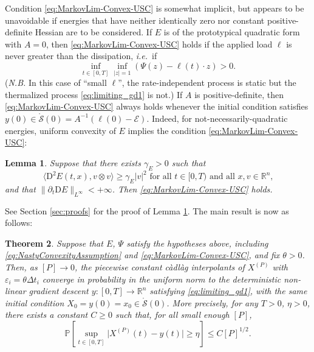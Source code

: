 \documentclass[reqno]{amsart}
\newtheorem{theorem}{Theorem}[section]
\newtheorem{lemma}[theorem]{Lemma}
\theoremstyle{definition}
\begin{document}
Condition \eqref{eq:MarkovLim-Convex-USC} is somewhat implicit, but appears to be unavoidable if energies that have neither identically zero nor constant positive-definite Hessian are to be considered.  If $E$ is of the prototypical quadratic form with $A = 0$, then \eqref{eq:MarkovLim-Convex-USC} holds if the applied load $\ell$ is never greater than the dissipation, \emph{i.e.}\ if
\[
	\inf_{t \in [0, T]} \inf_{| z | = 1} \left( \Psi(z) - \ell(t) \cdot z \right) > 0.
\]
(\emph{N.B.}  In this case of ``small $\ell$'', the rate-independent process is static but the thermalized process \eqref{eq:limiting_gd1} is not.)  If $A$ is positive-definite, then \eqref{eq:MarkovLim-Convex-USC} always holds whenever the initial condition satisfies $y(0) \in \mathring{\mathcal{S}}(0) = A^{-1} ( \ell(0) - {\mathcal{E}} )$.  Indeed, for not-necessarily-quadratic energies, uniform convexity of $E$ implies the condition \eqref{eq:MarkovLim-Convex-USC}:

\begin{lemma}
	\label{lem:unif_cvx_implies_good}
	Suppose that there exists $\gamma_{E} > 0$ such that
	\[
		\langle {\mathrm{D}}^{2} E(t, x) , v \otimes v \rangle \geq \gamma_{E} | v |^{2} \text{ for all $t \in [0, T)$ and all $x, v \in {\mathbb{R}}^{n}$,}
	\]
	and that $\| \partial_{t} {\mathrm{D}} E \|_{L^{\infty}} < + \infty$.  Then \eqref{eq:MarkovLim-Convex-USC} holds.
\end{lemma}

See Section \ref{sec:proofs} for the proof of Lemma \ref{lem:unif_cvx_implies_good}.  The main result is now as follows:

\begin{theorem}
	\label{thm:main} 	Suppose that $E$, $\Psi$ satisfy the hypotheses above, including \eqref{eq:NastyConvexityAssumption} and \eqref{eq:MarkovLim-Convex-USC}, and fix $\theta > 0$.  Then, as $[P] \to 0$, the piecewise constant c{\`a}dl{\`a}g interpolants of $X^{(P)}$ with ${\varepsilon}_{i} = \theta \Delta t_{i}$ converge in probability in the uniform norm to the deterministic non-linear gradient descent $y \colon [0, T] \to {\mathbb{R}}^{n}$ satisfying \eqref{eq:limiting_gd1}, with the same initial condition $X_{0} = y(0) = x_{0} \in \mathring{\mathcal{S}}(0)$.  More precisely, for any $T > 0$, $\eta > 0$, there exists a constant $C \geq 0$ such that, for all small enough $[P]$,
	\begin{equation}
		\label{eq:MarkovLim-Convex-Estimate}
		\mathbb{P} \left[ \sup_{t \in [0, T]} \big| X^{(P)}(t) - y(t) \big| \geq \eta \right] \leq C [P]^{1/2}.
	\end{equation}
\end{theorem}
\end{document}
